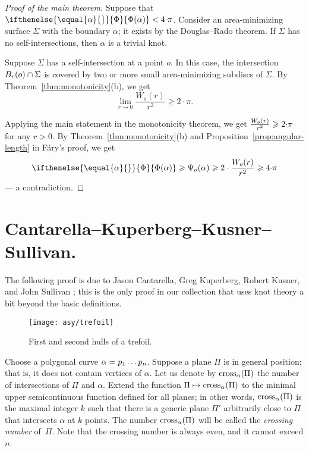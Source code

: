 \documentclass{article}
\newcommand*{\arXiv}[2]{#1} %
\newcommand*{\z}[1]{#1\nobreak\discretionary{}%
            {\hbox{$\mathsurround=0pt #1$}}{}}
\theoremstyle{theorem}
\newtheorem{Crofton-type formula}[theorem]{Crofton-type formula}
\newtheorem{Douglas--Rado theorem}[theorem]{\arXiv{Douglas--Rado theorem}{Theorem}}
\newtheorem{Extended monotonicity theorem}[theorem]{\arXiv{Extended monotonicity theorem}{Theorem}}
\theoremstyle{definition}
\def\cross{\mathop{\rm cross}\nolimits}
\newcommand*{\tc}[1]{\ifthenelse{\equal{#1}{}}{\Phi}{\Phi({#1})}}%
\def\ge{\geqslant}
\begin{document}
\begin{proof}[Proof of \arXiv{the main theorem}{Main Theorem}]
Suppose that $\tc\alpha<4\arXiv{{\cdot}}{}\pi$.
Consider an area-minimizing surface $\Sigma$ with the boundary $\alpha$; it exists by \arXiv{the Douglas–Rado theorem}{Theorem~\ref{thm:min-exists}}.
If $\Sigma$ has no self-intersections, then $\alpha$ is a trivial knot.

Suppose $\Sigma$ has a self-intersection at a point $o$.
In this case, the intersection $B_r(o)\z\cap \Sigma$ is covered by two or more small area-minimizing subdiscs of $\Sigma$.
By Theorem~\ref{thm:monotonicity}(b), we get 
\[\lim_{r\to0}\frac{W_o(r)}{r^2}\ge 2\arXiv{{\cdot}}{}\pi.\]

Applying the main statement in \arXiv{the monotonicity theorem}{Theorem~\ref{thm:monotonicity}}, we get $\frac{W_o(r)}{r^2}\z\ge 2\arXiv{{\cdot}}{}\pi$ for any $r>0$.
By Theorem~\ref{thm:monotonicity}(b) and Proposition~\ref{prop:angular-length} in Fáry's proof, we get
\[\tc{\alpha}\ge \Psi_o(\alpha)\ge 2\arXiv{\cdot}{} \frac{W_o(r)}{r^2}\ge 4\arXiv{{\cdot}}{}\pi\]
--- a contradiction.
\end{proof}


\section{Cantarella--Kuperberg--Kusner--Sullivan.}\label{sec:2nd-hull}

The following proof is due to Jason Cantarella, Greg Kuperberg, Robert Kusner, and John Sullivan \cite{CKKS};
this is the only proof in our collection that uses knot theory a bit beyond the basic definitions.

\begin{figure}[!ht]
\vskip-0mm
\centering
\arXiv{\texttt{[image: asy/trefoil]}}{\texttt{[image: trefoil]}}
\caption{First and second hulls of a trefoil.}
\label{fig12}
\vskip0mm
\end{figure}

Choose a polygonal curve $\alpha\z=p_1\dots p_n$.
Suppose a plane $\Pi$ is in general position; that is, it does not contain vertices of $\alpha$.
Let us denote by $\cross_\alpha(\Pi)$ the number of intersections of $\Pi$ and $\alpha$.
Extend the function $\Pi\z\mapsto \cross_\alpha(\Pi)$ to the minimal upper semicontinuous function defined for all planes;
in other words, $\cross_\alpha(\Pi)$ is the maximal integer $k$ such that there is a generic plane $\Pi'$ arbitrarily close to $\Pi$ that intersects $\alpha$ at $k$ points.
The number $\cross_\alpha(\Pi)$ will be called the \emph{crossing number} of~$\Pi$.
Note that the crossing number is always even, and it cannot exceed $n$.
\end{document}
